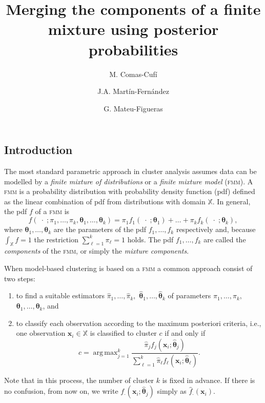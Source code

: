 \documentclass[10pt, a4paper]{article}
\title{Merging the components of a finite mixture using  posterior probabilities}
\author{M. Comas-Cufí \and J.A. Martín-Fernández \and G. Mateu-Figueras}
\DeclareMathOperator*{\argmax}{arg\,max}
\newcommand{\m}[1]{\boldsymbol{#1}}
\newcommand{\fmm}{\textsc{fmm}\xspace}
\begin{document}
\begin{spacing}{1.9}


\maketitle

\section{Introduction}

The most standard parametric approach in cluster analysis assumes data can be modelled by a \emph{finite mixture of distributions} or a \emph{finite mixture model} (\fmm). A \fmm is a probability distribution with probability density function (pdf) defined as the linear combination of pdf from distributions with domain $\mathbb{X}$. In general, the pdf $f$ of a \fmm is
\begin{equation}\label{mixt}
f(\;\cdot\; ; \pi_1, \dots, \pi_k, \m\theta_1, \dots, \m\theta_k) = \pi_1 f_1(\;\cdot\; ; \m\theta_1) + \dots + \pi_k f_k(\;\cdot\; ; \m\theta_k),
\end{equation}
where $\m\theta_1, \dots,  \m\theta_k$ are the parameters of the pdf $f_1, \dots, f_k$ respectively and, because $\int_{\mathbb{X}}f = 1$ the restriction $\sum_{\ell = 1}^k \pi_\ell = 1$ holds. The pdf $f_1, \dots, f_k$ are called the \emph{components} of the \fmm, or simply the \emph{mixture components}.


When model-based clustering is based on a \fmm a common approach consist of two steps:
\begin{enumerate}
\item to find a suitable estimators $\hat{\pi}_1, \dots, \hat{\pi}_k,$ $\hat{\m\theta}_1, \dots, \hat{\m\theta}_k$ of parameters $\pi_1, \dots, \pi_k,$ $\m\theta_1, \dots, \m\theta_k$, and
\item to classify each observation according to the maximum posteriori criteria, i.e., one observation $\m x_i \in \mathbb{X}$ is classified to cluster $c$ if and only if
\[
c=\argmax_{j=1}^k \frac{ \hat{\pi}_j f_j(\m x_i ; \hat{\m\theta}_j) }{\sum_{\ell=1}^k \hat{\pi}_\ell f_\ell(\m x_i ; \hat{\m\theta}_\ell) }.
\]
\end{enumerate}
Note that in this process, the number of cluster $k$ is fixed in advance. If there is no confusion, from now on, we write $f_\cdot(\m x_i ; \hat{\m\theta}_j)$ simply as $\hat{f}_\cdot(\m x_i)$.


\end{spacing}
\end{document}
